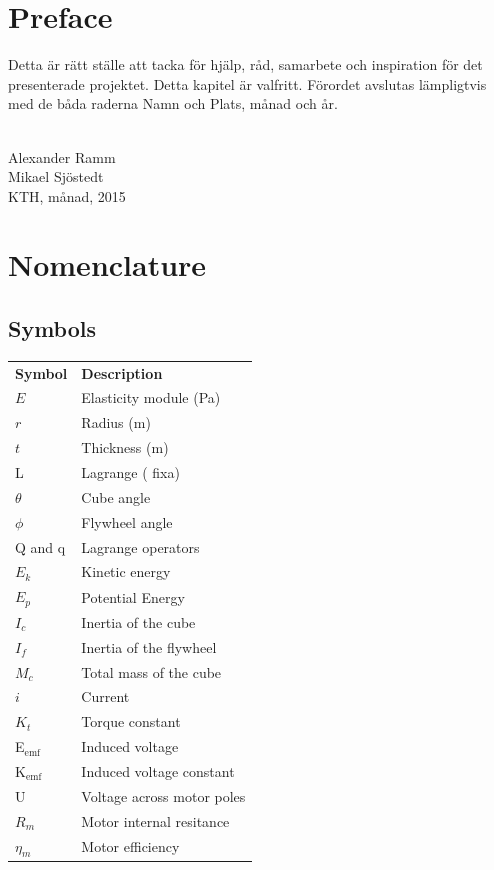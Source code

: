 \documentclass[a4paper,11pt]{kth-mag}
\newcommand{\textunderscript}[1]{$_{\text{#1}}$}
\begin{document}
\chapter*{Preface}
Detta är rätt ställe att tacka för hjälp, råd, samarbete och inspiration för det presenterade projektet. Detta kapitel är valfritt. 
Förordet avslutas lämpligtvis med de båda raderna Namn och Plats, månad och år. \\ \\
\begin{flushright}Alexander Ramm \\Mikael Sjöstedt \\ KTH, månad, 2015 \end{flushright}




\cleardoublepage
{}
\printindex
\tableofcontents*

\cleardoublepage
\chapter*{Nomenclature}
\section*{Symbols}
\noindent{}\begin{tabular}{@{}p{2.5cm}l}
\textbf{Symbol} 	& \textbf{Description} \vspace{.5em} \\
$E$ 		& Elasticity module (Pa) \\
$r$		& Radius (m) \\
$t$		& Thickness (m) \\
L			& Lagrange ( fixa) \\
$\theta$		& Cube angle\\
$\phi$		& Flywheel angle \\
Q and q		& Lagrange operators \\
$E_k	$		& Kinetic energy \\
$E_p$		& Potential Energy \\
$I_c$		& Inertia of the cube\\
$I_f$		& Inertia of the flywheel\\
$M_c$		& Total mass of the cube\\
$i$			& Current\\
$K_t$		& Torque constant\\
E\textunderscript{emf} 	& Induced voltage \\
K\textunderscript{emf} 	& Induced voltage constant \\
U			& Voltage across motor poles\\
$R_m	$		& Motor internal resitance \\
$\eta_m$		& Motor efficiency\\	
\end{tabular}
\end{document}
